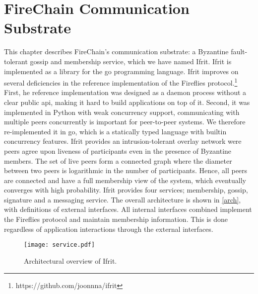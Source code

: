 \documentclass[USenglish]{uit-thesis}
\begin{document}
\chapter{FireChain Communication Substrate} \label{chap:firecomm}


This chapter describes FireChain's communication substrate: a Byzantine fault-tolerant gossip and membership service, which we have named Ifrit.
Ifrit is implemented as a library for the \gls{go} programming language. 
Ifrit improves on several deficiencies in the reference implementation of the Fireflies protocol.\footnote{https://github.com/joonnna/ifrit}
First, he reference implementation was designed as a daemon process without a clear public \gls{api}, making it hard to build applications on top of it.
Second, it was implemented in Python with weak concurrency support, communicating with multiple peers concurrently is important for peer-to-peer systems. 
We therefore re-implemented it in \gls{go}, which is a statically typed language with builtin concurrency features.
Ifrit provides an intrusion-tolerant overlay network were peers agree upon liveness of participants even in the presence of Byzantine members.
The set of live peers form a connected graph where the diameter between two peers is logarithmic in the number of participants.
Hence, all peers are connected and have a full membership view of the system, which eventually converges with high probability. 
Ifrit provides four services; membership, gossip, signature and a messaging service. 
The overall architecture is shown in \autoref{arch}, with definitions of external interfaces.
All internal interfaces combined implement the Fireflies protocol and maintain membership information. This is done regardless of application interactions through the external interfaces.
\begin{figure}[H]
	\centering
	\hspace*{-2cm}
	\texttt{[image: service.pdf]}
	\caption{Architectural overview of Ifrit.}
	\label{arch}
\end{figure}
\end{document}
